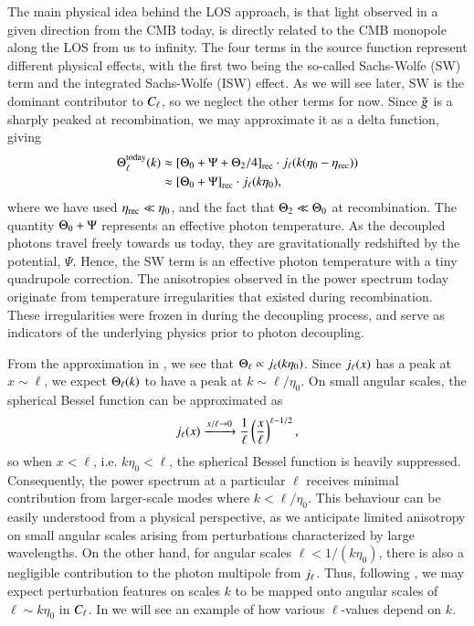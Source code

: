 The main physical idea behind the LOS approach, is that light observed in a given direction from the CMB today, is directly related to the CMB monopole along the LOS from us to infinity. The four terms in the source function represent different physical effects, with the first two being the so-called Sachs-Wolfe (SW) term and the integrated Sachs-Wolfe (ISW) effect. As we will see later, SW is the dominant contributor to $C_\ell$, so we neglect the other terms for now. Since $\tilde{g}$ is a sharply peaked at recombination, we may approximate it as a delta function, giving 
\begin{equation} \label{eq:M4:theory:Theta_ell_today_SW_approximation}
    \begin{split}
        \Theta_\ell^\mathrm{today}(k)&\approx \left[ \Theta_0 + \Psi + \Theta_2/4 \right]_\mathrm{rec}\cdot j_\ell(k(\eta_0-\eta_\mathrm{rec})) \\ 
        &\approx\left[ \Theta_0 + \Psi \right]_\mathrm{rec}\cdot j_\ell(k\eta_0) , 
    \end{split}
\end{equation}
where we have used $\eta_\mathrm{rec}\ll\eta_0$, and the fact that $\Theta_2\ll\Theta_0$ at recombination. The quantity $\Theta_0+\Psi$ represents an effective photon temperature. As the decoupled photons travel freely towards us today, they are gravitationally redshifted by the potential, $\Psi$. Hence, the SW term is an effective photon temperature with a tiny quadrupole correction. The anisotropies observed in the power spectrum today originate from temperature irregularities that existed during recombination. These irregularities were frozen in during the decoupling process, and serve as indicators of the underlying physics prior to photon decoupling.

From the approximation in , we see that $\Theta_\ell\propto j_\ell(k\eta_0)$. Since $j_\ell(x)$ has a peak at $x\sim\ell$, we expect $\Theta_\ell(k)$ to have a peak at $k\sim\ell/\eta_0$. On small angular scales, the spherical Bessel function can be approximated as \cite[Eq. (9.61)]{Dodelson}
\begin{equation}
    j_\ell(x) \xrightarrow{x/\ell\to0} \frac{1}{\ell}\left( \frac{x}{\ell} \right)^{\ell-1/2},
\end{equation} 
so when $x<\ell$, i.e. $k\eta_0<\ell$, the spherical Bessel function is heavily suppressed. Consequently, the power spectrum at a particular $\ell$ receives minimal contribution from larger-scale modes where $k<\ell/\eta_0$. This behaviour can be easily understood from a physical perspective, as we anticipate limited anisotropy on small angular scales arising from perturbations characterized by large wavelengths. On the other hand, for angular scales $\ell<1/(k\eta_0)$, there is also a negligible contribution to the photon multipole from $j_\ell$. Thus, following , we may expect perturbation features on scales $k$ to be mapped onto angular scales of $\ell\sim k\eta_0$ in $C_\ell$. In  we will see an example of how various $\ell$-values depend on $k$.   

